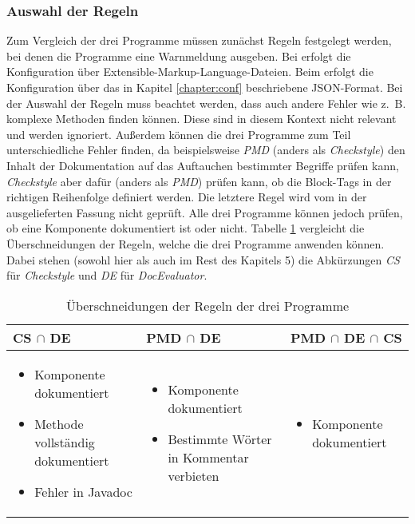 \subsubsection{Auswahl der Regeln}
Zum Vergleich der drei Programme müssen zunächst Regeln festgelegt werden, bei denen die Programme eine Warnmeldung ausgeben. Bei \checkpmd{} erfolgt die Konfiguration über  Extensible-Markup-Language-Dateien. Beim \doceval erfolgt die Konfiguration über das in Kapitel \ref{chapter:conf} beschriebene \ac{JSON}-Format. Bei der Auswahl der Regeln muss beachtet werden, dass \checkpmd auch andere Fehler wie z.~B. komplexe Methoden finden können. Diese sind in diesem Kontext nicht relevant und werden ignoriert. Außerdem können die drei Programme zum Teil unterschiedliche Fehler finden, da beispielsweise \textit{PMD} (anders als \textit{Checkstyle}) den Inhalt der Dokumentation auf das Auftauchen bestimmter Begriffe prüfen kann, \textit{Checkstyle} aber dafür (anders als \textit{PMD}) prüfen kann, ob die Block-Tags in der richtigen Reihenfolge definiert werden. Die letztere Regel wird vom \doceval in der ausgelieferten Fassung nicht geprüft. Alle drei Programme können jedoch prüfen, ob eine Komponente dokumentiert ist oder nicht. Tabelle \ref{tab:inters_rules} vergleicht die Überschneidungen der Regeln, welche die drei Programme anwenden können. Dabei stehen (sowohl hier als auch im Rest des Kapitels 5) die Abkürzungen \textit{CS} für \textit{Checkstyle} und \textit{DE} für \textit{DocEvaluator}.

\begin{table}[]
    \centering
    \begin{tabular}{m{4.5cm}|m{4.5cm}|m{4.5cm}}
     \textbf{CS} $\cap$ \textbf{DE}  & \textbf{PMD} $\cap$ \textbf{DE} & \textbf{PMD} $\cap$ \textbf{DE} $\cap$  \textbf{CS}  \\\hline
     \begin{itemize}
        \item Komponente dokumentiert
        \item Methode vollständig dokumentiert
         \item Fehler in Javadoc
     \end{itemize}
      & 
      \begin{itemize}
          \item  Komponente dokumentiert

          \item Bestimmte Wörter in Kommentar verbieten
      \end{itemize}
      & 
       \begin{itemize}
          \item  Komponente dokumentiert
         
      \end{itemize}
      \\\hline
    \end{tabular}
    \caption{Überschneidungen der Regeln der drei Programme}
    \label{tab:inters_rules}
\end{table}


